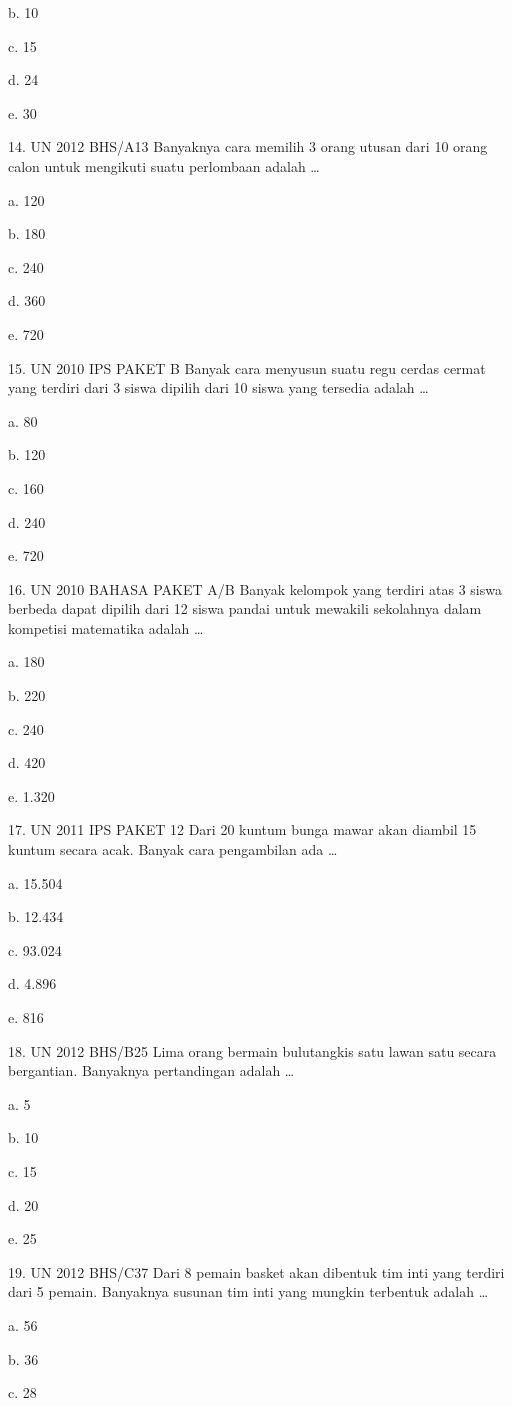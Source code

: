 \documentclass[11pt,fleqn]{book} %
\begin{document}
b.	10

c.	15

d.	24

e.	30

14.	UN 2012 BHS/A13 
Banyaknya cara memilih 3 orang utusan dari 10 orang calon untuk mengikuti suatu perlombaan adalah …

a.	120

b.	180

c.	240

d.	360

e.	720

15.	UN 2010 IPS PAKET B 
Banyak cara menyusun suatu regu cerdas cermat yang terdiri dari 3 siswa dipilih dari 10 siswa yang tersedia adalah …

a.	80

b.	120

c.	160

d.	240

e.	720

16.	UN 2010 BAHASA PAKET A/B 
Banyak kelompok yang terdiri atas 3 siswa berbeda dapat dipilih dari 12 siswa pandai untuk mewakili sekolahnya dalam kompetisi matematika adalah …

a.	180

b.	220

c.	240

d.	420

e.	1.320

17.	UN 2011 IPS PAKET 12 
Dari 20 kuntum bunga mawar akan diambil 15 kuntum secara acak. Banyak cara pengambilan ada …

a.	15.504

b.	12.434

c.	93.024

d.	4.896

e.	816

18.	UN 2012 BHS/B25 
Lima orang bermain bulutangkis satu lawan satu secara bergantian. Banyaknya pertandingan adalah …

a.	5

b.	10

c.	15

d.	20

e.	25

19.	UN 2012 BHS/C37 
Dari 8 pemain basket akan dibentuk tim inti yang terdiri dari 5 pemain. Banyaknya susunan tim inti yang mungkin terbentuk adalah …

a.	56

b.	36

c.	28
\end{document}
